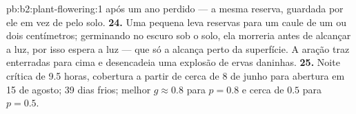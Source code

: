 \begin{solution}{pb:b2:plant-flowering:1}
após um ano perdido --- a mesma reserva, guardada por ele em vez de pelo
solo.
\textbf{24.} Uma  pequena leva reservas para um caule de um ou
dois centímetros; germinando no escuro sob o solo, ela morreria antes
de alcançar a luz, por isso espera a luz --- que só a alcança perto da
superfície. A aração traz  enterradas para cima e desencadeia
uma explosão de ervas daninhas.
\textbf{25.} Noite crítica de 9.5 horas, cobertura a partir de cerca de
8 de junho para abertura em 15 de agosto; 39 dias frios; melhor
$g \approx 0.8$ para $p = 0.8$ e cerca de $0.5$ para $p = 0.5$.
\end{solution}
